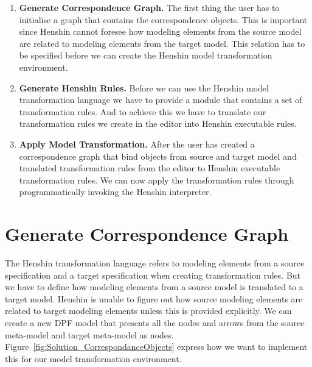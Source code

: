 \begin{enumerate}

\item \textbf{Generate Correspondence Graph.} The first thing the user has to
initialise a graph that contains the correspondence objects. This is important since
Henshin cannot foresee how modeling elements from the source model are related
to modeling elements from the target model. This relation has to be specified
before we can create the Henshin model transformation environment. 

\item \textbf{Generate Henshin Rules.} Before we can use the Henshin model
transformation language we have to provide a module that contains a set of transformation
rules. And to achieve this we have to translate our transformation rules we
create in the editor into Henshin executable rules. 

\item \textbf{Apply Model Transformation.} After the user has created a
correspondence graph that bind objects from source and target model and
translated transformation rules from the editor to Henshin executable
transformation rules. We can now apply the transformation rules through
programmatically invoking the Henshin interpreter.

\end{enumerate}


\section{Generate Correspondence Graph}

The Henshin transformation language refers to modeling elements from a source
specification and a target specification when creating transformation rules. But
we have to define how modeling elements from a source model is translated to a
target model. Henshin is unable to figure out how source modeling elements are
related to target modeling elements unless this is provided explicitly. We can
create a new DPF model that presents all the nodes and arrows from the source
meta-model and target meta-model as nodes.
Figure~\ref{fig:Solution_CorrespondanceObjects} express how we want to implement
this for our model transformation environment.

